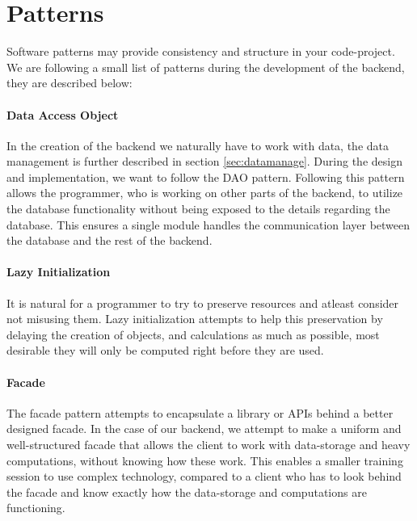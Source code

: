 \section{Patterns}
\label{sec:bpatterns}
Software patterns may provide consistency and structure in your code-project. We are following a small list of patterns during the development of the backend, they are described below:

\paragraph{Data Access Object}
In the creation of the backend we naturally have to work with data, the data management is further described in section \ref{sec:datamanage}. During the design and implementation, we want to follow the DAO pattern. Following this pattern allows the programmer, who is working on other parts of the backend, to utilize the database functionality without being exposed to the details regarding the database. This ensures a single module handles the communication layer between the database and the rest of the backend.

\paragraph{Lazy Initialization}
It is natural for a programmer to try to preserve resources and atleast consider not misusing them. Lazy initialization attempts to help this preservation by delaying the creation of objects, and calculations as much as possible, most desirable they will only be computed right before they are used.

\paragraph{Facade}
The facade pattern attempts to encapsulate a library or APIs behind a better designed facade. In the case of our backend, we attempt to make a uniform and well-structured facade that allows the client to work with data-storage and heavy computations, without knowing how these work. This enables a smaller training session to use complex technology, compared to a client who has to look behind the facade and know exactly how the data-storage and computations are functioning.
